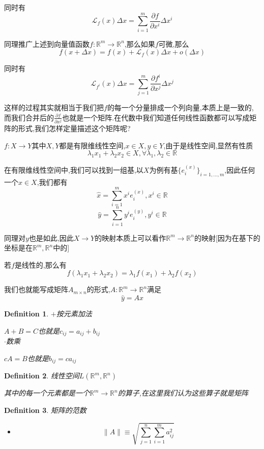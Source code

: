 \documentclass[11pt,hyperref,a4paper,UTF8]{ctexart}
\newtheorem{definition}{Definition}[subsection]
\newcommand{\RR}{\mathbb{R}}
\begin{document}
\begin{CJK}{UTF8}{gkai}
同时有
\[\mathcal{L}_{f}(x)\Delta x  = \sum_{i = 1}^{m}\frac{\partial f}{\partial x^i} \Delta x^i\]

同理推广上述到向量值函数$f : \RR^m \to \RR^n$,那么如果$f$可微,那么
\[f(x + \Delta x) = f(x) + \mathcal{L}_{f}(x) \Delta x + o(\Delta x)\]

同时有
\[\mathcal{L}_{f^i}(x)\Delta x  = \sum_{j = 1}^{m}\frac{\partial f^i}{\partial x^j} \Delta x^j\]

这样的过程其实就相当于我们把$f$的每一个分量排成一个列向量,本质上是一致的,而我们合并后的$\frac{\partial f}{\partial x^j}$也就是一个矩阵.在代数中我们知道任何线性函数都可以写成矩阵的形式,我们怎样定量描述这个矩阵呢?

$f:X \to Y$其中$X,Y$都是有限维线性空间,$x \in X,y \in Y$,由于是线性空间,显然有性质
\[\lambda_1 x_1 +\lambda_2 x_2 \in X,\forall \lambda_1,\lambda_2 \in \RR\]

在有限维线性空间中,我们可以找到一组基,以$X$为例有基$\{e_i^{(x)}\}_{i = 1,\ldots,m}$,因此任何一个$x \in X$,我们都有
\[\hat{x} = \sum_{i = 1}^{m}x^i e_i^{(x)},x^i \in \RR\]
\[\hat{y} = \sum_{i = 1}^{n}y^i e_i^{(y)},y^i \in \RR\]

同理对$y$也是如此,因此$X \to Y$的映射本质上可以看作$\RR^m \to \RR^n$的映射[因为在基下的坐标是在$\RR^m,\RR^n$中的]

若$f$是线性的,那么有
\[f(\lambda_1 x_1 + \lambda_2 x_2) = \lambda_1 f(x_1) + \lambda_2 f(x_2)\]

我们也就能写成矩阵$A_{m \times n}$的形式,$A: \RR^m \to \RR^n$满足
\[\hat{y} = A \hat{x}\]

\begin{definition}
  $+$按元素加法

  $A + B = C$也就是$c_{ij} = a_{ij} + b_{ij}$\\

  $\cdot$数乘

  $c A = B$也就是$b_{ij} = c a_{ij}$
\end{definition}

\begin{definition}
  线性空间$L(\RR^m ,\RR^n)$

  其中的每一个元素都是一个$\RR^m \to \RR^n$的算子,在这里我们认为这些算子就是矩阵
\end{definition}

\begin{definition}
  矩阵的范数\\

  \begin{itemize}
    \item \[\|A\| \equiv \sqrt{\sum_{j = 1}^{n}\sum_{i = 1}^{m}a_{ij}^2}\]


\end{itemize}
\end{definition}
\end{CJK}
\end{document}
